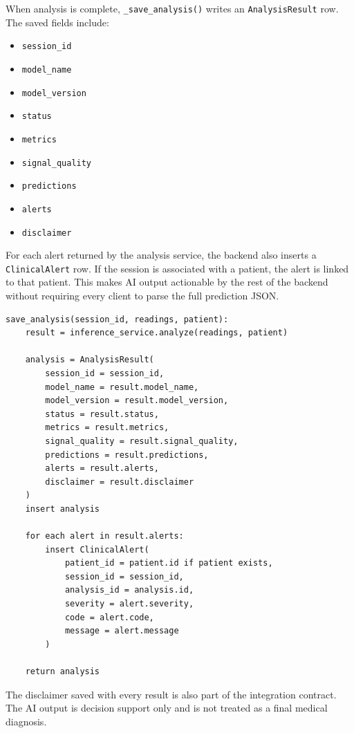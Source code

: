 When analysis is complete, \texttt{\_save\_analysis()} writes an \texttt{AnalysisResult} row. The saved fields include:

\begin{itemize}
    \item \texttt{session\_id}
    \item \texttt{model\_name}
    \item \texttt{model\_version}
    \item \texttt{status}
    \item \texttt{metrics}
    \item \texttt{signal\_quality}
    \item \texttt{predictions}
    \item \texttt{alerts}
    \item \texttt{disclaimer}
\end{itemize}

For each alert returned by the analysis service, the backend also inserts a \texttt{ClinicalAlert} row. If the session is associated with a patient, the alert is linked to that patient. This makes AI output actionable by the rest of the backend without requiring every client to parse the full prediction JSON.

\begin{lstlisting}[caption={Pseudocode for saving analysis and clinical alerts}]
save_analysis(session_id, readings, patient):
    result = inference_service.analyze(readings, patient)

    analysis = AnalysisResult(
        session_id = session_id,
        model_name = result.model_name,
        model_version = result.model_version,
        status = result.status,
        metrics = result.metrics,
        signal_quality = result.signal_quality,
        predictions = result.predictions,
        alerts = result.alerts,
        disclaimer = result.disclaimer
    )
    insert analysis

    for each alert in result.alerts:
        insert ClinicalAlert(
            patient_id = patient.id if patient exists,
            session_id = session_id,
            analysis_id = analysis.id,
            severity = alert.severity,
            code = alert.code,
            message = alert.message
        )

    return analysis
\end{lstlisting}

The disclaimer saved with every result is also part of the integration contract. The AI output is decision support only and is not treated as a final medical diagnosis.

